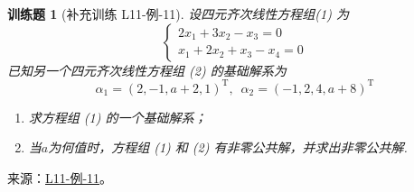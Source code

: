 \documentclass[UTF8,12pt,a4paper,fontset=fandol]{ctexart}
\newtheorem{exercise}{训练题}[section]
\begin{document}
\begin{exercise}[补充训练 L11-例-11]\label{prob:L11-例-11}
设四元齐次线性方程组(1) 为\[\begin{cases}
            2x_1+3x_2-x_3=0 \\ x_1+2x_2+x_3-x_4=0
        \end{cases}\]已知另一个四元齐次线性方程组 (2) 的基础解系为
    \[\alpha_1=(2,-1,a+2,1)^\mathrm{T},\enspace\alpha_2=(-1,2,4,a+8)^\mathrm{T}\]
    \begin{enumerate}
        \item 求方程组 (1) 的一个基础解系；

        \item 当$a$为何值时，方程组 (1) 和 (2) 有非零公共解，并求出非零公共解.
    \end{enumerate}
\end{exercise}
\noindent 来源：\href{https://github.com/yhwu-is/Linear-Algebra-Left-Undone/blob/new/%E8%AE%B2%E4%B9%89/%E4%B8%93%E9%A2%98/11%20%E6%9C%9D%E8%8A%B1%E5%A4%95%E6%8B%BE.tex}{L11-例-11}。
\end{document}
